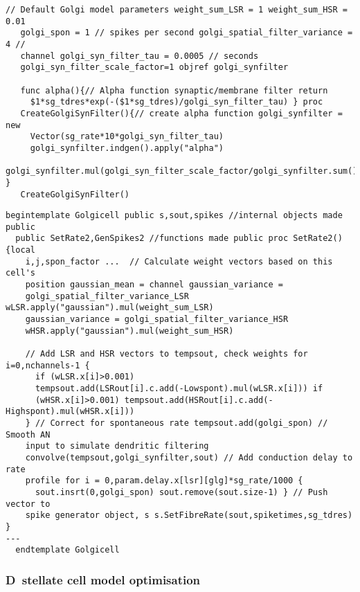 
 \begin{lstlisting}[label=lstGolgiSyn,caption=Create golgi cell rate vector
   within Golgi template (in CNcell.tem)]
   // Default Golgi model parameters weight_sum_LSR = 1 weight_sum_HSR = 0.01
   golgi_spon = 1 // spikes per second golgi_spatial_filter_variance = 4 //
   channel golgi_syn_filter_tau = 0.0005 // seconds
   golgi_syn_filter_scale_factor=1 objref golgi_synfilter

   func alpha(){// Alpha function synaptic/membrane filter return
     $1*sg_tdres*exp(-($1*sg_tdres)/golgi_syn_filter_tau) } proc
   CreateGolgiSynFilter(){// create alpha function golgi_synfilter = new
     Vector(sg_rate*10*golgi_syn_filter_tau)
     golgi_synfilter.indgen().apply("alpha")
     golgi_synfilter.mul(golgi_syn_filter_scale_factor/golgi_synfilter.sum()) }
   CreateGolgiSynFilter()
 \end{lstlisting}



\begin{lstlisting}[label=lst:GolgiTemplate,caption=Rate-based golgi cell model
  template (in par\_CNcell.tem)]
  begintemplate Golgicell public s,sout,spikes //internal objects made public
  public SetRate2,GenSpikes2 //functions made public proc SetRate2() {local
    i,j,spon_factor ...  // Calculate weight vectors based on this cell's
    position gaussian_mean = channel gaussian_variance =
    golgi_spatial_filter_variance_LSR wLSR.apply("gaussian").mul(weight_sum_LSR)
    gaussian_variance = golgi_spatial_filter_variance_HSR
    wHSR.apply("gaussian").mul(weight_sum_HSR)

    // Add LSR and HSR vectors to tempsout, check weights for i=0,nchannels-1 {
      if (wLSR.x[i]>0.001)
      tempsout.add(LSRout[i].c.add(-Lowspont).mul(wLSR.x[i])) if
      (wHSR.x[i]>0.001) tempsout.add(HSRout[i].c.add(-Highspont).mul(wHSR.x[i]))
    } // Correct for spontaneous rate tempsout.add(golgi_spon) // Smooth AN
    input to simulate dendritic filtering
    convolve(tempsout,golgi_synfilter,sout) // Add conduction delay to rate
    profile for i = 0,param.delay.x[lsr][glg]*sg_rate/1000 {
      sout.insrt(0,golgi_spon) sout.remove(sout.size-1) } // Push vector to
    spike generator object, s s.SetFibreRate(sout,spiketimes,sg_tdres) }
---
  endtemplate Golgicell

\end{lstlisting}



\subsubsection[D~stellate cell model]{D~stellate cell model
  optimisation}\label{sec:APDX:d-stellate-cell}

